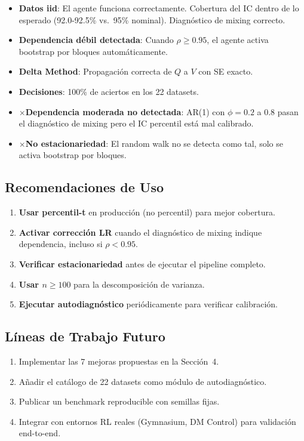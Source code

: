 \documentclass[12pt,a4paper]{article}
\newcommand{\ok}{\textcolor{cbgreen}{\checkmark}}
\newcommand{\fail}{\textcolor{cbred}{$\times$}}
\begin{document}
\begin{itemize}
    \item \ok \textbf{Datos iid}: El agente funciona correctamente. Cobertura del IC dentro de lo esperado (92.0-92.5\% vs.\ 95\% nominal). Diagnóstico de mixing correcto.
    \item \ok \textbf{Dependencia débil detectada}: Cuando $\rho \geq 0.95$, el agente activa bootstrap por bloques automáticamente.
    \item \ok \textbf{Delta Method}: Propagación correcta de $Q$ a $V$ con SE exacto.
    \item \ok \textbf{Decisiones}: 100\% de aciertos en los 22 datasets.
    \item \fail \textbf{Dependencia moderada no detectada}: AR(1) con $\phi=0.2$ a $0.8$ pasan el diagnóstico de mixing pero el IC percentil está mal calibrado.
    \item \fail \textbf{No estacionariedad}: El random walk no se detecta como tal, solo se activa bootstrap por bloques.
\end{itemize}

\subsection{Recomendaciones de Uso}

\begin{enumerate}
    \item \textbf{Usar percentil-t} en producción (no percentil) para mejor cobertura.
    \item \textbf{Activar corrección LR} cuando el diagnóstico de mixing indique dependencia, incluso si $\rho < 0.95$.
    \item \textbf{Verificar estacionariedad} antes de ejecutar el pipeline completo.
    \item \textbf{Usar $n \geq 100$} para la descomposición de varianza.
    \item \textbf{Ejecutar autodiagnóstico} periódicamente para verificar calibración.
\end{enumerate}

\subsection{Líneas de Trabajo Futuro}

\begin{enumerate}
    \item Implementar las 7 mejoras propuestas en la Sección~4.
    \item Añadir el catálogo de 22 datasets como módulo de autodiagnóstico.
    \item Publicar un benchmark reproducible con semillas fijas.
    \item Integrar con entornos RL reales (Gymnasium, DM Control) para validación end-to-end.
\end{enumerate}
\end{document}
